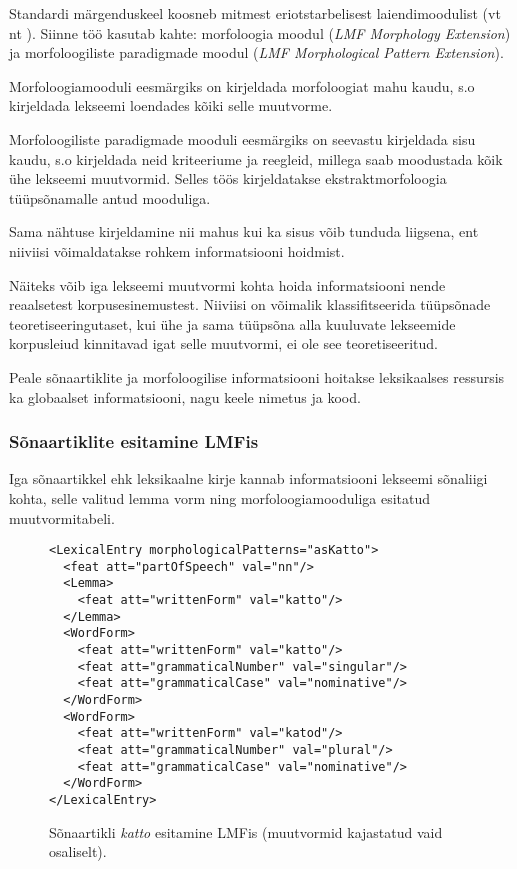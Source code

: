 \documentclass[12pt,a4paper]{article}
\begin{document}
Standardi märgenduskeel koosneb mitmest eriotstarbelisest laiendimoodulist (vt nt \cite{francopoulo_lmf_2013}). Siinne töö kasutab kahte: morfoloogia moodul (\textit{LMF Morphology Extension}) ja morfoloogiliste paradigmade moodul (\textit{LMF Morphological Pattern Extension}).

Morfoloogiamooduli eesmärgiks on kirjeldada morfoloogiat mahu kaudu, s.o kirjeldada lekseemi loendades kõiki selle muutvorme.

Morfoloogiliste paradigmade mooduli eesmärgiks on seevastu kirjeldada sisu kaudu, s.o kirjeldada neid kriteeriume ja reegleid, millega saab moodustada kõik ühe lekseemi muutvormid. Selles töös kirjeldatakse ekstraktmorfoloogia tüüpsõnamalle antud mooduliga.

Sama nähtuse kirjeldamine nii mahus kui ka sisus võib tunduda liigsena, ent niiviisi võimaldatakse rohkem informatsiooni hoidmist.

Näiteks võib iga lekseemi muutvormi kohta hoida informatsiooni nende reaalsetest korpusesinemustest. Niiviisi on võimalik klassifitseerida tüüpsõnade teoretiseeringutaset, kui ühe ja sama tüüpsõna alla kuuluvate lekseemide korpusleiud kinnitavad igat selle muutvormi, ei ole see teoretiseeritud.


Peale sõnaartiklite ja morfoloogilise informatsiooni hoitakse leksikaalses ressursis ka globaalset informatsiooni, nagu keele nimetus ja kood.




\subsubsection{Sõnaartiklite esitamine LMFis}
Iga sõnaartikkel ehk leksikaalne kirje kannab informatsiooni lekseemi sõnaliigi kohta, selle valitud lemma vorm ning morfoloogiamooduliga esitatud muutvormitabeli.

\begin{figure}[p]
  \center
\begin{verbatim}
<LexicalEntry morphologicalPatterns="asKatto">
  <feat att="partOfSpeech" val="nn"/>
  <Lemma>
    <feat att="writtenForm" val="katto"/>
  </Lemma>
  <WordForm>
    <feat att="writtenForm" val="katto"/>
    <feat att="grammaticalNumber" val="singular"/>
    <feat att="grammaticalCase" val="nominative"/>
  </WordForm>
  <WordForm>
    <feat att="writtenForm" val="katod"/>
    <feat att="grammaticalNumber" val="plural"/>
    <feat att="grammaticalCase" val="nominative"/>
  </WordForm>
</LexicalEntry>
\end{verbatim}
\caption{Sõnaartikli \textit{katto} esitamine LMFis (muutvormid kajastatud vaid osaliselt).
  \label{code:lmf-lexicalentry}}
\end{figure}
\end{document}
